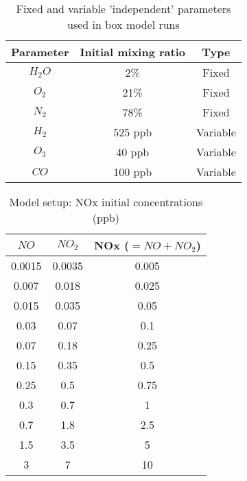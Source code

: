\documentclass[11pt,a4paper]{article}
\begin{document}
\begin{table} %
\caption{Fixed and variable 'independent' parameters used in box model runs}\label{tab:setupO3CO}
\centering
\begin{tabular}{ccc}
\hline
Parameter & Initial mixing ratio & Type \\
\hline
$H_2O$    & 2\%                  & Fixed    \\
$O_2$     & 21\%                 & Fixed    \\
$N_2$     & 78\%                 & Fixed    \\
$H_2$     & 525 ppb              & Variable \\
$O_3$     & 40 ppb               & Variable \\
$CO$      & 100 ppb              & Variable \\
\hline
\end{tabular}
\end{table}	

\begin{table} %
\caption{Model setup: NOx initial concentrations (ppb)}\label{tab:setupNOx}
\centering
\begin{tabular}{ccc}
\hline
$NO$      & $NO_2$      & NOx  ($=NO+NO_2$) \\
\hline
0.0015    & 0.0035      & 0.005 \\
0.007     & 0.018       & 0.025 \\
0.015     & 0.035       & 0.05  \\
0.03      & 0.07        & 0.1   \\
0.07      & 0.18        & 0.25  \\
0.15      & 0.35        & 0.5   \\
0.25      & 0.5         & 0.75  \\
0.3       & 0.7         & 1     \\
0.7       & 1.8         & 2.5   \\
1.5       & 3.5         & 5     \\
3         & 7           & 10    \\
\hline
\end{tabular}
\end{table}	
\end{document}

